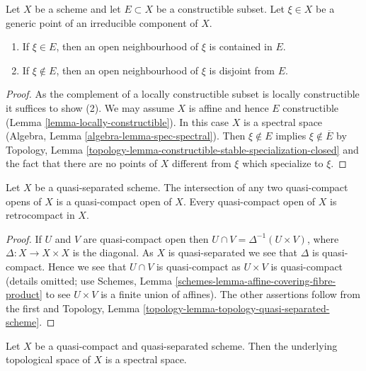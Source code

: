 \begin{lemma}
\label{lemma-generic-point-in-constructible}
Let $X$ be a scheme and let $E \subset X$ be a constructible subset.
Let $\xi \in X$ be a generic point of an irreducible component of $X$.
\begin{enumerate}
\item If $\xi \in E$, then an open neighbourhood of
$\xi$ is contained in $E$.
\item If $\xi \not \in E$, then an open neighbourhood
of $\xi$ is disjoint from $E$.
\end{enumerate}
\end{lemma}

\begin{proof}
As the complement of a locally constructible subset is locally
constructible it suffices to show (2). We may assume $X$ is
affine and hence $E$ constructible (Lemma \ref{lemma-locally-constructible}).
In this case $X$ is a spectral space
(Algebra, Lemma \ref{algebra-lemma-spec-spectral}).
Then $\xi \not \in E$ implies $\xi \not \in \overline{E}$ by
Topology, Lemma \ref{topology-lemma-constructible-stable-specialization-closed}
and the fact that there are no points of $X$ different from $\xi$
which specialize to $\xi$.
\end{proof}

\begin{lemma}
\label{lemma-quasi-separated-quasi-compact-open-retrocompact}
Let $X$ be a quasi-separated scheme. The intersection of any two
quasi-compact opens of $X$ is a quasi-compact open of $X$.
Every quasi-compact open of $X$ is retrocompact in $X$.
\end{lemma}

\begin{proof}
If $U$ and $V$ are quasi-compact open then
$U \cap V = \Delta^{-1}(U \times V)$, where $\Delta : X \to X \times X$
is the diagonal. As $X$ is quasi-separated we see that $\Delta$ is
quasi-compact. Hence we see that $U \cap V$ is quasi-compact as
$U \times V$ is quasi-compact (details omitted; use
Schemes, Lemma \ref{schemes-lemma-affine-covering-fibre-product}
to see $U \times V$ is a finite union of affines).
The other assertions follow from the first and
Topology, Lemma \ref{topology-lemma-topology-quasi-separated-scheme}.
\end{proof}

\begin{lemma}
\label{lemma-quasi-compact-quasi-separated-spectral}
Let $X$ be a quasi-compact and quasi-separated scheme.
Then the underlying topological space of $X$ is a spectral space.
\end{lemma}

